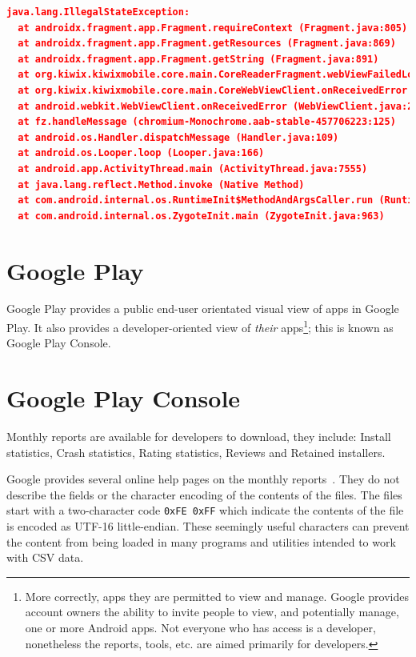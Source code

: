 \begin{lstlisting}[language=json, caption=Exported contents for a crash reported in Android Vitals in Sept 2021, label=listing:crash-stack-trace-in-kiwix]
  java.lang.IllegalStateException: 
  at androidx.fragment.app.Fragment.requireContext (Fragment.java:805)
  at androidx.fragment.app.Fragment.getResources (Fragment.java:869)
  at androidx.fragment.app.Fragment.getString (Fragment.java:891)
  at org.kiwix.kiwixmobile.core.main.CoreReaderFragment.webViewFailedLoading (CoreReaderFragment.java:1478)
  at org.kiwix.kiwixmobile.core.main.CoreWebViewClient.onReceivedError (CoreWebViewClient.java:112)
  at android.webkit.WebViewClient.onReceivedError (WebViewClient.java:298)
  at fz.handleMessage (chromium-Monochrome.aab-stable-457706223:125)
  at android.os.Handler.dispatchMessage (Handler.java:109)
  at android.os.Looper.loop (Looper.java:166)
  at android.app.ActivityThread.main (ActivityThread.java:7555)
  at java.lang.reflect.Method.invoke (Native Method)
  at com.android.internal.os.RuntimeInit$MethodAndArgsCaller.run (RuntimeInit.java:469)
  at com.android.internal.os.ZygoteInit.main (ZygoteInit.java:963)
\end{lstlisting}

\section{Google Play}
Google Play provides a public end-user orientated visual view of apps in Google Play. It also provides a developer-oriented view of \emph{their} apps\footnote{More correctly, apps they are permitted to view and manage. Google provides account owners the ability to invite people to view, and potentially manage, one or more Android apps. Not everyone who has access is a developer, nonetheless the reports, tools, etc. are aimed primarily for developers.}; this is known as Google Play Console.

\section{Google Play Console}
Monthly reports are available for developers to download, they include: Install statistics, Crash statistics, Rating statistics, Reviews and Retained installers. 

Google provides several online help pages on the monthly reports~\citep{google_play_download_and_export_monthly_reports}. They do not describe the fields or the character encoding of the contents of the files. The files start with a two-character code \texttt{0xFE 0xFF} which indicate the contents of the file is encoded as UTF-16 little-endian. These seemingly useful characters can prevent the content from being loaded in many programs and utilities intended to work with CSV data.

